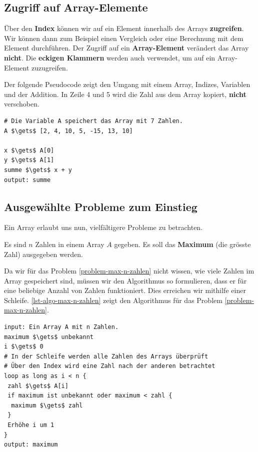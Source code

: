 \subsection{Zugriff auf Array-Elemente}

Über den \textbf{Index} können wir auf ein Element innerhalb des Arrays \textbf{zugreifen}. Wir können dann zum Beispiel einen Vergleich oder eine Berechnung mit dem Element durchführen. Der Zugriff auf ein \textbf{Array-Element} verändert das Array \textbf{nicht}. Die \textbf{eckigen Klammern} werden auch verwendet, um auf ein Array-Element zuzugreifen.

\begin{example}
Der folgende Pseudocode zeigt den Umgang mit einem Array, Indizes, Variablen und der Addition. In Zeile 4 und 5 wird die Zahl aus dem Array kopiert, \textbf{nicht} verschoben.
\begin{lstlisting}[language=pseudocode, caption={Die ersten beiden Zahlen des Arrays werden addiert.}, label={lst-array-examples-1}]
# Die Variable A speichert das Array mit 7 Zahlen.
A $\gets$ [2, 4, 10, 5, -15, 13, 10]

x $\gets$ A[0]
y $\gets$ A[1]
summe $\gets$ x + y
output: summe
\end{lstlisting}
\end{example}

\subsection{Ausgewählte Probleme zum Einstieg}

Ein Array erlaubt uns nun, vielfältigere Probleme zu betrachten.

\begin{problem}\label{problem-max-n-zahlen}
Es sind $n$ Zahlen in einem Array $A$ gegeben. Es soll das \textbf{Maximum} (die grösste Zahl) ausgegeben werden.
\end{problem}

Da wir für das Problem \autoref{problem-max-n-zahlen} nicht wissen, wie viele Zahlen im Array gespeichert sind, müssen wir den Algorithmus so formulieren, dass er für eine beliebige Anzahl von Zahlen funktioniert. Dies erreichen wir mithilfe einer Schleife. \autoref{lst-algo-max-n-zahlen} zeigt den Algorithmus für das Problem \autoref{problem-max-n-zahlen}.

\begin{lstlisting}[language=pseudocode, caption={In Zeile \num{5} greifen wir auf das Array zu und kopieren die Zahl aus dem Array mit dem Index \lstinline{i} in die Variable \lstinline{zahl}.}, label={lst-algo-max-n-zahlen}]
input: Ein Array A mit n Zahlen.
maximum $\gets$ unbekannt
i $\gets$ 0
# In der Schleife werden alle Zahlen des Arrays überprüft
# Über den Index wird eine Zahl nach der anderen betrachtet
loop as long as i < n {
 zahl $\gets$ A[i]
 if maximum ist unbekannt oder maximum < zahl {
  maximum $\gets$ zahl
 }
 Erhöhe i um 1
}
output: maximum
\end{lstlisting}

